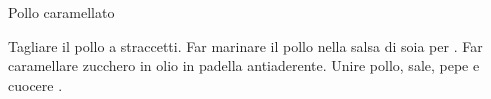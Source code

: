 \begin{recipe}{Pollo caramellato}
    \begin{header}

    \end{header}
    
    \begin{ingredients}
    \end{ingredients}
    
    \begin{preparation}
        \step Tagliare il pollo a straccetti.
        \step Far marinare il pollo nella salsa di soia per .
        \step Far caramellare zucchero in olio in padella antiaderente.
        \step Unire pollo, sale, pepe e cuocere .
    \end{preparation}
    
\end{recipe}
